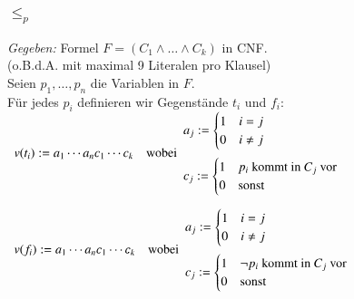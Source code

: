 \documentclass[aspectratio=1610,onlymath]{beamer}
\begin{document}
\begin{frame}
  \frametitle{ $\leq_p$ }
    \emph{Gegeben: } Formel $F = (C_1 \wedge \dots \wedge C_k)$ in
  CNF.\\
  (o.B.d.A. mit maximal 9 Literalen pro Klausel)\pause\\[1ex]
  Seien $p_1, \dots, p_n$ die Variablen in $F$.\\
  Für jedes $p_i$ definieren wir Gegenstände $t_i$ und $f_i$:\\[10pt]

  $\begin{array}{ll}
    v(t_i) := a_1 \cdots a_n c_1 \cdots c_k & {\text{wobei}}
    \begin{array}{l}
      a_j :=
      \begin{cases}
        1 & i=j\\
        0 & i\not=j
      \end{cases}\\[15pt]
      c_j :=
      \begin{cases}
        1 & p_i \text{ kommt in } C_j\text{ vor}\\
        0 & \text{sonst}
      \end{cases}
    \end{array}
  \end{array}$

  \bigskip\pause

  $\begin{array}{ll}
    v(f_i) := a_1 \cdots a_n c_1 \cdots c_k & \text{wobei} 
    \begin{array}{l}
      a_j :=
      \begin{cases}
        1 & i=j\\
        0 & i\not=j
      \end{cases}\\[15pt]
      c_j :=
      \begin{cases}
        1 & {\neg p_i} \text{ kommt in } C_j\text{ vor}\\
        0 & \text{sonst}
      \end{cases}
    \end{array}
  \end{array}$
\end{frame}

\end{document}
